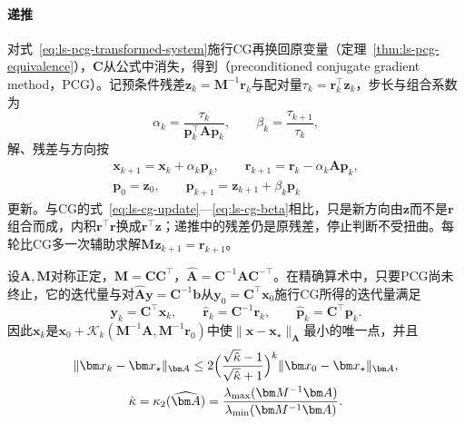 \paragraph{递推}
对式~\eqref{eq:ls-pcg-transformed-system}施行CG再换回原变量（定理~\ref{thm:ls-pcg-equivalence}），$\bm C$从公式中消失，得到（preconditioned conjugate gradient method，PCG）。记预条件残差$\bm z_k=\bm M^{-1}\bm r_k$与配对量$\tau_k=\bm r_k^\top\bm z_k$，步长与组合系数为
\begin{equation}
 \alpha_k=\frac{\tau_k}{\bm p_k^\top\bm A\bm p_k},\qquad \beta_k=\frac{\tau_{k+1}}{\tau_k},
 \label{eq:ls-pcg-coefficients}
\end{equation}
解、残差与方向按
\begin{equation}
 \begin{gathered}
 \bm x_{k+1}=\bm x_k+\alpha_k\bm p_k,\qquad
 \bm r_{k+1}=\bm r_k-\alpha_k\bm A\bm p_k,\\
 \bm p_0=\bm z_0,\qquad \bm p_{k+1}=\bm z_{k+1}+\beta_k\bm p_k
 \end{gathered}
 \label{eq:ls-pcg-updates}
\end{equation}
更新。与CG的式~\eqref{eq:ls-cg-update}—\eqref{eq:ls-cg-beta}相比，只是新方向由$\bm z$而不是$\bm r$组合而成，内积$\bm r^\top\bm r$换成$\bm r^\top\bm z$；递推中的残差仍是原残差，停止判断不受扭曲。每轮比CG多一次辅助求解$\bm M\bm z_{k+1}=\bm r_{k+1}$。

\begin{theorem}[PCG与变换后CG的等价]
\label{thm:ls-pcg-equivalence}
设$\bm A,\bm M$对称正定，$\bm M=\bm C\bm C^\top$，$\widehat{\bm A}=\bm C^{-1}\bm A\bm C^{-\top}$。在精确算术中，只要PCG尚未终止，它的迭代量与对$\widehat{\bm A}\bm y=\bm C^{-1}\bm b$从$\bm y_0=\bm C^\top\bm x_0$施行CG所得的迭代量满足
\begin{equation}
 \bm y_k=\bm C^\top\bm x_k,\qquad \hat{\bm r}_k=\bm C^{-1}\bm r_k,\qquad \hat{\bm p}_k=\bm C^\top\bm p_k .
 \label{eq:ls-pcg-correspondence}
\end{equation}
因此$\bm x_k$是$\bm x_0+\mathcal K_k(\bm M^{-1}\bm A,\bm M^{-1}\bm r_0)$中使$\lVert\bm x-\bm x_\star\rVert_{\bm A}$最小的唯一点，并且
\begin{equation}
 \begin{gathered}
 \lVert\bm x_k-\bm x_\star\rVert_{\bm A}\le2\Bigl(\frac{\sqrt{\hat\kappa}-1}{\sqrt{\hat\kappa}+1}\Bigr)^k\lVert\bm x_0-\bm x_\star\rVert_{\bm A},\\
 \hat\kappa=\kappa_2(\widehat{\bm A})=\frac{\lambda_{\max}(\bm M^{-1}\bm A)}{\lambda_{\min}(\bm M^{-1}\bm A)} .
 \end{gathered}
 \label{eq:ls-pcg-convergence-bound}
\end{equation}
\end{theorem}

